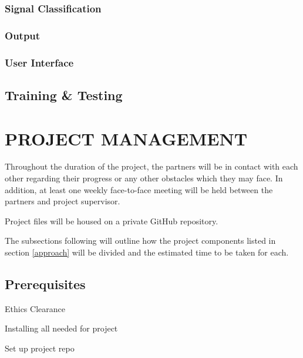\documentclass[10pt,twocolumn]{witseiepaper}
\begin{document}
\subsubsection{Signal Classification}



\subsubsection{Output}

\subsubsection{User Interface}

\subsection{Training \& Testing}



\section{PROJECT MANAGEMENT} %
Throughout the duration of the project, the partners will be in contact with each other regarding their progress or any other obstacles which they may face. In addition, at least one weekly face-to-face meeting will be held between the partners and project supervisor.

Project files will be housed on a private GitHub repository.

The subsections following will outline how the project components listed in section \ref{approach} will be divided and the estimated time to be taken for each.

\subsection{Prerequisites}
Ethics Clearance

Installing all needed for project

Set up project repo
\end{document}
